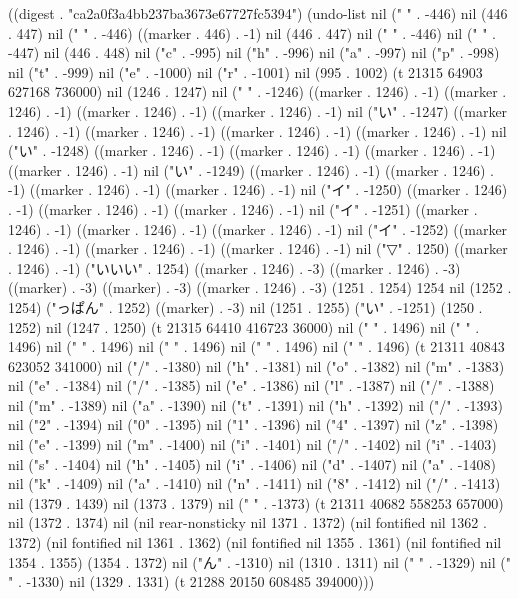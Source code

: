 
((digest . "ca2a0f3a4bb237ba3673e67727fc5394") (undo-list nil (" " . -446) nil (446 . 447) nil (" " . -446) ((marker . 446) . -1) nil (446 . 447) nil (" " . -446) nil (" " . -447) nil (446 . 448) nil ("c" . -995) nil ("h" . -996) nil ("a" . -997) nil ("p" . -998) nil ("t" . -999) nil ("e" . -1000) nil ("r" . -1001) nil (995 . 1002) (t 21315 64903 627168 736000) nil (1246 . 1247) nil ("
" . -1246) ((marker . 1246) . -1) ((marker . 1246) . -1) ((marker . 1246) . -1) ((marker . 1246) . -1) nil ("い" . -1247) ((marker . 1246) . -1) ((marker . 1246) . -1) ((marker . 1246) . -1) ((marker . 1246) . -1) nil ("い" . -1248) ((marker . 1246) . -1) ((marker . 1246) . -1) ((marker . 1246) . -1) ((marker . 1246) . -1) nil ("い" . -1249) ((marker . 1246) . -1) ((marker . 1246) . -1) ((marker . 1246) . -1) ((marker . 1246) . -1) nil ("イ" . -1250) ((marker . 1246) . -1) ((marker . 1246) . -1) ((marker . 1246) . -1) nil ("イ" . -1251) ((marker . 1246) . -1) ((marker . 1246) . -1) ((marker . 1246) . -1) nil ("イ" . -1252) ((marker . 1246) . -1) ((marker . 1246) . -1) ((marker . 1246) . -1) nil ("▽" . 1250) ((marker . 1246) . -1) ("いいい" . 1254) ((marker . 1246) . -3) ((marker . 1246) . -3) ((marker) . -3) ((marker) . -3) ((marker . 1246) . -3) (1251 . 1254) 1254 nil (1252 . 1254) ("っぱん" . 1252) ((marker) . -3) nil (1251 . 1255) ("い" . -1251) (1250 . 1252) nil (1247 . 1250) (t 21315 64410 416723 36000) nil ("
" . 1496) nil ("
" . 1496) nil ("
" . 1496) nil ("
" . 1496) nil ("
" . 1496) nil ("
" . 1496) (t 21311 40843 623052 341000) nil ("/" . -1380) nil ("h" . -1381) nil ("o" . -1382) nil ("m" . -1383) nil ("e" . -1384) nil ("/" . -1385) nil ("e" . -1386) nil ("l" . -1387) nil ("/" . -1388) nil ("m" . -1389) nil ("a" . -1390) nil ("t" . -1391) nil ("h" . -1392) nil ("/" . -1393) nil ("2" . -1394) nil ("0" . -1395) nil ("1" . -1396) nil ("4" . -1397) nil ("z" . -1398) nil ("e" . -1399) nil ("m" . -1400) nil ("i" . -1401) nil ("/" . -1402) nil ("i" . -1403) nil ("s" . -1404) nil ("h" . -1405) nil ("i" . -1406) nil ("d" . -1407) nil ("a" . -1408) nil ("k" . -1409) nil ("a" . -1410) nil ("n" . -1411) nil ("8" . -1412) nil ("/" . -1413) nil (1379 . 1439) nil (1373 . 1379) nil (" " . -1373) (t 21311 40682 558253 657000) nil (1372 . 1374) nil (nil rear-nonsticky nil 1371 . 1372) (nil fontified nil 1362 . 1372) (nil fontified nil 1361 . 1362) (nil fontified nil 1355 . 1361) (nil fontified nil 1354 . 1355) (1354 . 1372) nil ("ん" . -1310) nil (1310 . 1311) nil ("
" . -1329) nil (" " . -1330) nil (1329 . 1331) (t 21288 20150 608485 394000)))
